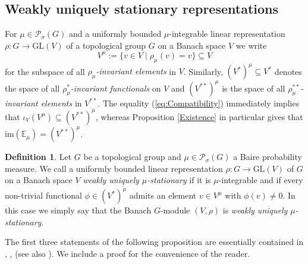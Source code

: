 \documentclass[a4paper,11pt,reqno]{amsart}
\numberwithin{equation}{section}
\theoremstyle{definition}
\newtheorem{definition}[theorem]{Definition}
\theoremstyle{remark}
\theoremstyle{remark}
\begin{document}
\vspace{3mm}


\subsection{Weakly uniquely stationary representations}

For $\mu\in\mathcal{P}_{\sigma}(G)$ and a uniformly bounded $\mu$-integrable linear representation $\rho:G\rightarrow\text{GL}(V)$ of a topological group $G$ on a Banach space $V$ we write 
\[
V^{\mu}:=\{v\in V\mid\rho_{\mu}(v)=v\}\subseteq V
\]
for the subspace of all \emph{$\rho_{\mu}$-invariant elements} in $V$. Similarly, $(V^{\ast})^{\mu}\subseteq V^{\ast}$ denotes the space of all \emph{$\rho_{\mu}^{\ast}$-invariant functionals} on $V$ and $(V^{\ast\ast})^{\mu}$ is the space of all \emph{$\rho_{\mu}^{\ast\ast}$-invariant elements} in $V^{\ast\ast}$. The equality (\ref{eq:Compatibility}) immediately implies that $\iota_{V}(V^{\mu})\subseteq(V^{\ast\ast})^{\mu}$, whereas Proposition \ref{Existence} in particular gives that $\text{im}(\mathbb{E}_{\mu})=(V^{\ast\ast})^{\mu}$.

\begin{definition} \label{WeaklyUniquelyStationary} Let $G$ be a topological group and $\mu\in\mathcal{P}_{\sigma}(G)$ a Baire probability measure. We call a uniformly bounded linear representation $\rho:G\rightarrow\text{GL}(V)$ of $G$ on a Banach space $V$ \emph{weakly uniquely $\mu$-stationary} if it is $\mu$-integrable and if every non-trivial functional $\phi\in(V^{\ast})^{\breve{\mu}}$ admits an element $v\in V^{\mu}$ with $\phi(v)\neq0$. In this case we simply say that the Banach $G$-module $(V,\rho)$ is \emph{weakly uniquely $\mu$-stationary}. \end{definition}

The first three statements of the following proposition are essentially contained in \cite{Kakutani38}, \cite{Yosida38}, \cite{Sine70} (see also \cite[Chapter 2.1]{Krengel85}). We include a proof for the convenience of the reader.
\end{document}
